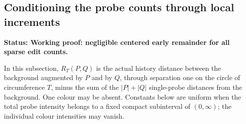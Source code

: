 \documentclass[11pt,letterpaper]{article}
\newcommand{\status}[1]{\textbf{Status: #1.}}
\begin{document}
\subsection{Conditioning the probe counts through local increments}
\label{sec:fixed-probe-remainder}

\status{Working proof: negligible centered early remainder for all sparse edit counts}

In this subsection, $R_T(P,Q)$ is the actual history distance
between the background augmented by $P$ and by $Q$, through
separation one on the circle of circumference $T$, minus the
sum of the $|P|+|Q|$ single-probe distances from the background.
One colour may be absent. Constants below are uniform when
the total probe intensity belongs to a fixed compact subinterval
of $(0,\infty)$; the individual colour intensities may vanish.
\end{document}
